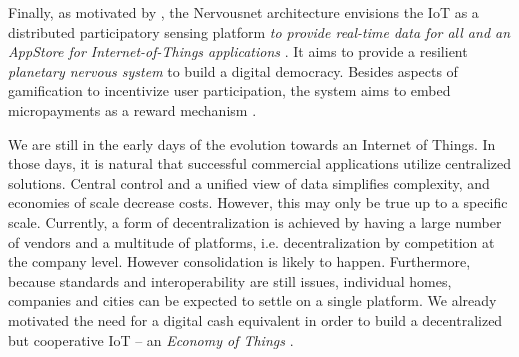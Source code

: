 Finally, as motivated by \cite{Giannotti2012}, the Nervousnet architecture envisions the IoT as a distributed participatory sensing platform \emph{to provide real-time data for all and an AppStore for Internet-of-Things applications} \parencite{7097988}. It aims to provide a resilient \emph{planetary nervous system} to build a digital democracy. Besides aspects of gamification to incentivize user participation, the system aims to embed micropayments as a reward mechanism \parencite{Helbing2015Nature}.

We are still in the early days of the evolution towards an Internet of Things. In those days, it is natural that successful commercial applications utilize centralized solutions. Central control and a unified view of data simplifies complexity, and economies of scale decrease costs. However, this may only be true up to a specific scale. Currently, a form of decentralization is achieved by having a large number of vendors and a multitude of platforms, i.e. decentralization by competition at the company level. However consolidation is likely to happen. Furthermore, because standards and interoperability are still issues, individual homes, companies and cities can be expected to settle on a single platform.
We already motivated the need for a digital cash equivalent in order to build a decentralized but cooperative IoT -- an \emph{Economy of Things} \parencite{Pureswaran2015}.








